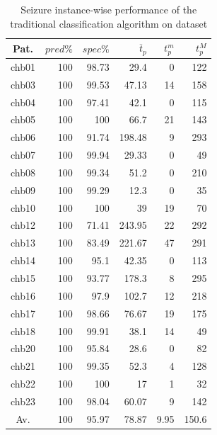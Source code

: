 \begin{table}[ht]
    \centering
    \begin{tabular}{c|rrrrr}
    Pat.  & $pred\%$ & $spec\%$ & $\overline{t}_p$   & $t_p^m$  & $t_p^M$   \\ \hline
    chb01 & 100    & 98.73  & 29.4   & 0    & 122   \\
    chb03 & 100    & 99.53  & 47.13  & 14   & 158   \\
    chb04 & 100    & 97.41  & 42.1   & 0    & 115   \\
    chb05 & 100    & 100    & 66.7   & 21   & 143   \\
    chb06 & 100    & 91.74  & 198.48 & 9    & 293   \\
    chb07 & 100    & 99.94  & 29.33  & 0    & 49    \\
    chb08 & 100    & 99.34  & 51.2   & 0    & 210   \\
    chb09 & 100    & 99.29  & 12.3   & 0    & 35    \\
    chb10 & 100    & 100    & 39     & 19   & 70    \\
    chb12 & 100    & 71.41  & 243.95 & 22   & 292   \\
    chb13 & 100    & 83.49  & 221.67 & 47   & 291   \\
    chb14 & 100    & 95.1   & 42.35  & 0    & 113   \\
    chb15 & 100    & 93.77  & 178.3  & 8    & 295   \\
    chb16 & 100    & 97.9   & 102.7  & 12   & 218   \\
    chb17 & 100    & 98.66  & 76.67  & 19   & 175   \\
    chb18 & 100    & 99.91  & 38.1   & 14   & 49    \\
    chb20 & 100    & 95.84  & 28.6   & 0    & 82    \\
    chb21 & 100    & 99.35  & 52.3   & 4    & 128   \\
    chb22 & 100    & 100    & 17     & 1    & 32    \\
    chb23 & 100    & 98.04  & 60.07  & 9    & 142   \\ \hline
    Av.   & 100    & 95.97  & 78.87  & 9.95 & 150.6 \\ \hline
    \end{tabular}
    \caption{Seizure instance-wise performance of the traditional classification algorithm on  dataset \cite{detti_patient-specific_2019}}
    \label{tab:siena-performance-seizure-sequence} 
\end{table}

